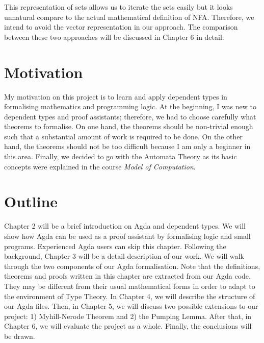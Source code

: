 \par This representation of sets allows us to
iterate the sets easily but it looks unnatural compare to the actual 
mathematical definition of NFA. Therefore, we intend
to avoid the vector representation in our approach. The comparison between these two
approaches will be discussed in Chapter 6 in detail. 


\section{Motivation}
\par My motivation on this project is to learn and apply
dependent types in formalising mathematics and programming logic. At the beginning, I
was new to dependent types and proof assistants; therefore, we
had to choose carefully what theorems to formalise. On one hand, the theorems
should be non-trivial enough such that a substantial amount of work is required
to be done. On the other hand, the theorems should not be too
difficult because I am only a beginner in this area. Finally, we
decided to go with the Automata Theory as its basic concepts were
explained in the course \textit{Model of Computation}. 


\section{Outline}
\par Chapter 2 will be a brief introduction on Agda and
dependent types. We will show how Agda can be used as a proof
assistant by formalising logic and small programs. Experienced Agda
users can skip this chapter. Following the background, Chapter 3 will be a detail description of our
work. We will walk through the two components of our Agda
formalisation. Note that the definitions,
theorems and proofs written in this chapter are extracted from our
Agda code. They may be different from
their usual mathematical forms in order to adapt to the environment of
Type Theory. In Chapter 4, we will describe the structure of our Agda
files. Then, in Chapter 5, we will discuss two possible extensions
to our project: 1) Myhill-Nerode Theorem and 2) the Pumping
Lemma. After that, in Chapter 6, we will evaluate the project as a
whole. Finally, the conclusions will be drawn. 